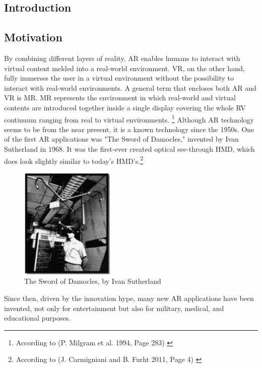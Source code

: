 \documentclass[12pt,a4paper,oneside,american,parskip=half]{article}
\begin{document}
\begin{justify}
	\begin{normalsize}


	\section{Introduction}
    \subsection{Motivation}
By combining different layers of reality, \ac{AR} enables humans to interact with virtual content melded into a real-­world environment. \ac{VR}, on the other hand, fully immerses the user in a virtual environment without the possibility to interact with real-world environments.
A general term that encloses both AR and VR is \ac{MR}. MR represents the environment in which real-­world and virtual contents are
introduced together inside a single display covering the whole \ac{RV} continuum ranging from real to virtual environments. \footnote{According to (P. Milgram et al. 1994, Page 283) \cite{motivation0}}
\newline
Although AR technology seems to be from the near present, it is a known technology since the 1950s. One of the first AR applications was "The Sword of Damocles," invented by Ivan Sutherland in 1968. It was the first-ever created optical see-through \ac{HMD}, which does look slightly similar to today's HMD's.\footnote{According to (J. Carmigniani and B. Furht 2011, Page 4) \cite{sutherland}}
\begin{figure}[h!]
\centering
\includegraphics[width=4.5cm]{sutherland.png}
\caption{The Sword of Damocles, by Ivan Sutherland \cite{sutherland}}
\end{figure}
\newline
Since then, driven by the innovation hype, many new AR applications have been invented, not only for entertainment but also for military, medical, and educational purposes. 

\end{normalsize}
\end{justify}
\end{document}

